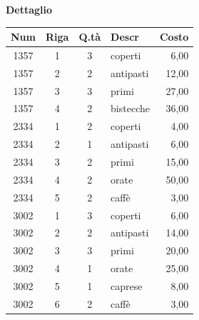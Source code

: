 \documentclass[12pt]{report}
\begin{document}
	\begin{center}
		\textbf{Dettaglio}

		\vspace{0.5cm}

		\begin{tabular}{|c|c|c|l|r|}
			\hline
			\textbf{Num} & \textbf{Riga} & \textbf{Q.tà} & \textbf{Descr} & \textbf{Costo} \\
			\hline
			1357 & 1 & 3 & coperti & 6,00 \\
			1357 & 2 & 2 & antipasti & 12,00 \\
			1357 & 3 & 3 & primi & 27,00 \\
			1357 & 4 & 2 & bistecche & 36,00 \\
			2334 & 1 & 2 & coperti & 4,00 \\
			2334 & 2 & 1 & antipasti & 6,00 \\
			2334 & 3 & 2 & primi & 15,00 \\
			2334 & 4 & 2 & orate & 50,00 \\
			2334 & 5 & 2 & caffè & 3,00 \\
			3002 & 1 & 3 & coperti & 6,00 \\
			3002 & 2 & 2 & antipasti & 14,00 \\
			3002 & 3 & 3 & primi & 20,00 \\
			3002 & 4 & 1 & orate & 25,00 \\
			3002 & 5 & 1 & caprese & 8,00 \\
			3002 & 6 & 2 & caffè & 3,00 \\
			\hline
		\end{tabular}
	\end{center}
\end{document}
